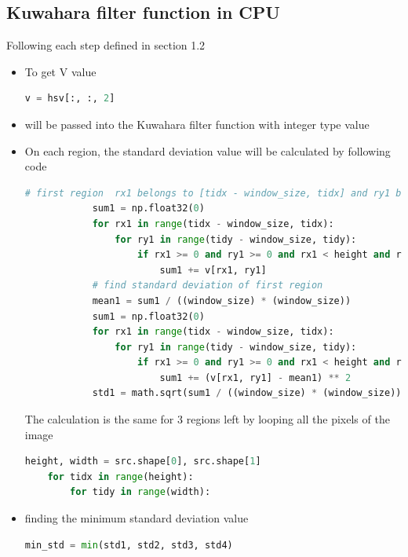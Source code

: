 \documentclass{article}
\begin{document}
\subsection{Kuwahara filter function in CPU}
Following each step defined in section 1.2
\begin{itemize}
    \item To get V value
    
    \begin{lstlisting}[language=Python]
    v = hsv[:, :, 2]
    \end{lstlisting}

    \item {} will be passed into the Kuwahara filter function with integer type value

    \item On each region, the standard deviation value will be calculated by following code

    \begin{lstlisting}[language=Python]
            # first region  rx1 belongs to [tidx - window_size, tidx] and ry1 belongs to [tidy - window_size, tidy]
            sum1 = np.float32(0)
            for rx1 in range(tidx - window_size, tidx): 
                for ry1 in range(tidy - window_size, tidy): 
                    if rx1 >= 0 and ry1 >= 0 and rx1 < height and ry1 < width:
                        sum1 += v[rx1, ry1]
            # find standard deviation of first region
            mean1 = sum1 / ((window_size) * (window_size))
            sum1 = np.float32(0)
            for rx1 in range(tidx - window_size, tidx): 
                for ry1 in range(tidy - window_size, tidy): 
                    if rx1 >= 0 and ry1 >= 0 and rx1 < height and ry1 < width:
                        sum1 += (v[rx1, ry1] - mean1) ** 2
            std1 = math.sqrt(sum1 / ((window_size) * (window_size)))
    \end{lstlisting}

    The calculation is the same for 3 regions left by looping all the pixels of the image
    
    \begin{lstlisting}[language=Python]
    height, width = src.shape[0], src.shape[1]
    for tidx in range(height):
        for tidy in range(width):
    \end{lstlisting}

    \item finding the minimum standard deviation value
    
    \begin{lstlisting}[language=Python]
    min_std = min(std1, std2, std3, std4)
    \end{lstlisting}


\end{itemize}
\end{document}
